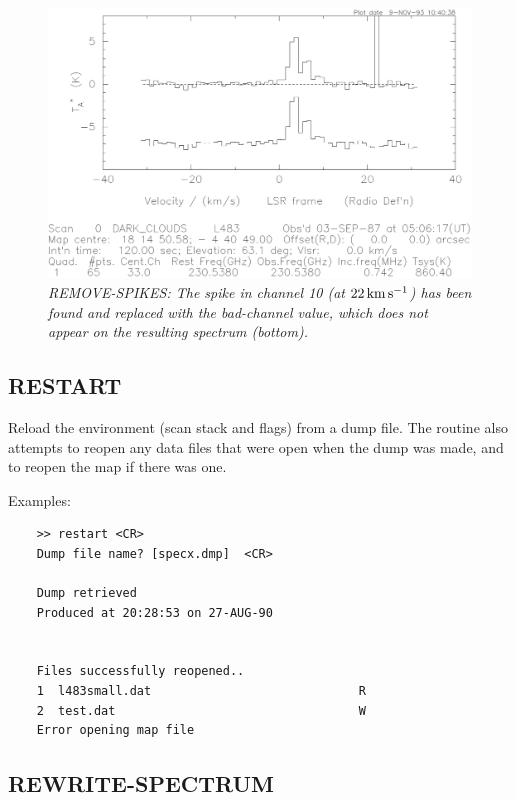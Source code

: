 \documentclass[11pt,twoside]{report}
\begin{document}
\begin{figure}[htbp]
\begin{center}
\includegraphics[scale=0.65]{rem-spikes.ps}
\protect\parbox{5.5in}
{\caption[SPIKES]
{\sl
REMOVE-SPIKES: The spike in channel 10 (at $22{\rm\,km\,s^{-1}}$) has been found and
replaced with the bad-channel value, which does not appear on the
resulting spectrum (bottom).
\label{SPIKES}
}
}
\end{center}
\end{figure}

\subsection{RESTART} 

Reload the environment  (\ie scan stack
and flags) from a dump file. The routine also attempts to reopen any data files
that were open when the dump was made, and to reopen the map if there was one. 

Examples:
\begin{verbatim}
    >> restart <CR>
    Dump file name? [specx.dmp]  <CR>

    Dump retrieved
    Produced at 20:28:53 on 27-AUG-90


    Files successfully reopened..
    1  l483small.dat                             R 
    2  test.dat                                  W 
    Error opening map file

\end{verbatim}

\subsection{REWRITE-SPECTRUM} 
\end{document}

